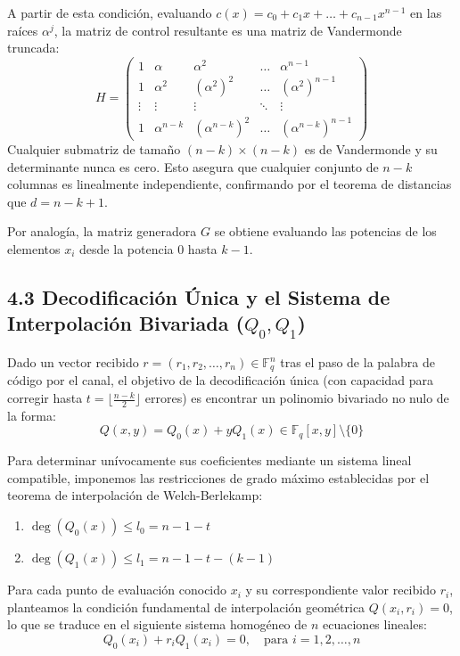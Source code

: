 \documentclass{article}
\begin{document}
A partir de esta condición, evaluando $c(x) = c_0 + c_1x + \dots + c_{n-1}x^{n-1}$ en las raíces $\alpha^j$, la matriz de control resultante es una matriz de Vandermonde truncada:
\[
H = \begin{pmatrix}
1 & \alpha & \alpha^2 & \dots & \alpha^{n-1} \\
1 & \alpha^2 & (\alpha^2)^2 & \dots & (\alpha^2)^{n-1} \\
\vdots & \vdots & \vdots & \ddots & \vdots \\
1 & \alpha^{n-k} & (\alpha^{n-k})^2 & \dots & (\alpha^{n-k})^{n-1}
\end{pmatrix}
\]
Cualquier submatriz de tamaño $(n-k) \times (n-k)$ es de Vandermonde y su determinante nunca es cero. Esto asegura que cualquier conjunto de $n-k$ columnas es linealmente independiente, confirmando por el teorema de distancias que $d = n - k + 1$. 

Por analogía, la matriz generadora $G$ se obtiene evaluando las potencias de los elementos $x_{i}$ desde la potencia $0$ hasta $k-1$.


\subsection{4.3 Decodificación Única y el Sistema de Interpolación Bivariada ($Q_0, Q_1$)}

Dado un vector recibido $r = (r_1, r_2, \dots, r_n) \in \mathbb{F}_q^n$ tras el paso de la palabra de código por el canal, el objetivo de la decodificación única (con capacidad para corregir hasta $t = \lfloor \frac{n-k}{2} \rfloor$ errores) es encontrar un polinomio bivariado no nulo de la forma:
\[
Q(x,y) = Q_0(x) + yQ_1(x) \in \mathbb{F}_q[x,y] \setminus \{0\}
\]

Para determinar unívocamente sus coeficientes mediante un sistema lineal compatible, imponemos las restricciones de grado máximo establecidas por el teorema de interpolación de Welch-Berlekamp:
\begin{enumerate}
    \item $\deg(Q_0(x)) \le l_0 = n - 1 - t$
    \item $\deg(Q_1(x)) \le l_1 = n - 1 - t - (k - 1)$
\end{enumerate}

Para cada punto de evaluación conocido $x_i$ y su correspondiente valor recibido $r_i$, planteamos la condición fundamental de interpolación geométrica $Q(x_i, r_i) = 0$, lo que se traduce en el siguiente sistema homogéneo de $n$ ecuaciones lineales:
\[
Q_0(x_i) + r_i Q_1(x_i) = 0, \quad \text{para } i = 1, 2, \dots, n
\]
\end{document}
